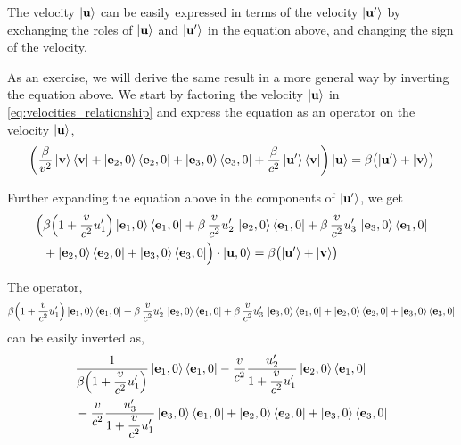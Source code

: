 \documentclass[12pt]{article}
\begin{document}
The velocity $\ket{\vb{u}}$ can be easily expressed in terms of the velocity $\ket{\vb{u}'}$
by exchanging the roles of $\ket{\vb{u}}$ and $\ket{\vb{u}'}$ in the equation above, and
changing the sign of the velocity.

As an exercise, we will derive the same result in a more general way by inverting the equation
above. We start by factoring the velocity $\ket{\vb{u}}$ in \eqref{eq:velocities_relationship}
and express the equation as an operator on the velocity $\ket{\vb{u}}$,
\begin{equation}
  \left(
    \frac{\beta}{v^2}\ket{\vb{v}}\bra{\vb{v}}
    + \ket{\vb{e}_2,0}\bra{\vb{e}_2,0}
    + \ket{\vb{e}_3,0}\bra{\vb{e}_3,0}
    + \frac{\beta}{c^2}\ket{\vb{u}'}\bra{\vb{v}}
  \right)\ket{\vb{u}}
  = \beta\bigl(\ket{\vb{u}'} + \ket{\vb{v}}\bigr)
\end{equation}

Further expanding the equation above in the components of $\ket{\vb{u}'}$, we get
\begin{equation}
  \begin{aligned}
    \Bigl(
      &\beta\!\left(1 + \frac{v}{c^2}u'_1\right)\ket{\vb{e}_1,0}\bra{\vb{e}_1,0}
      + \beta\,\frac{v}{c^2}u'_2\,\ket{\vb{e}_2,0}\bra{\vb{e}_1,0}
      + \beta\,\frac{v}{c^2}u'_3\,\ket{\vb{e}_3,0}\bra{\vb{e}_1,0} \\
      &+ \ket{\vb{e}_2,0}\bra{\vb{e}_2,0}
      + \ket{\vb{e}_3,0}\bra{\vb{e}_3,0}
    \Bigr)\cdot\ket{\vb{u},0}
    = \beta\bigl(\ket{\vb{u}'} + \ket{\vb{v}}\bigr)
  \end{aligned}
\end{equation}

The operator,
\begin{equation}
  \beta\!\left(1 + \frac{v}{c^2}u'_1\right)\ket{\vb{e}_1,0}\bra{\vb{e}_1,0}
  + \beta\,\frac{v}{c^2}u'_2\,\ket{\vb{e}_2,0}\bra{\vb{e}_1,0}
  + \beta\,\frac{v}{c^2}u'_3\,\ket{\vb{e}_3,0}\bra{\vb{e}_1,0}
  + \ket{\vb{e}_2,0}\bra{\vb{e}_2,0}
  + \ket{\vb{e}_3,0}\bra{\vb{e}_3,0}
\end{equation}
can be easily inverted as,
\begin{equation}
  \begin{aligned}
    &\frac{1}{\displaystyle\beta\!\left(1 + \frac{v}{c^2}u'_1\right)}
      \ket{\vb{e}_1,0}\bra{\vb{e}_1,0}
    - \frac{v}{c^2}\frac{u'_2}{\displaystyle 1 + \frac{v}{c^2}u'_1}
      \ket{\vb{e}_2,0}\bra{\vb{e}_1,0} \\
    &- \frac{v}{c^2}\frac{u'_3}{\displaystyle 1 + \frac{v}{c^2}u'_1}
      \ket{\vb{e}_3,0}\bra{\vb{e}_1,0}
    + \ket{\vb{e}_2,0}\bra{\vb{e}_2,0}
    + \ket{\vb{e}_3,0}\bra{\vb{e}_3,0}
  \end{aligned}
\end{equation}
\end{document}
